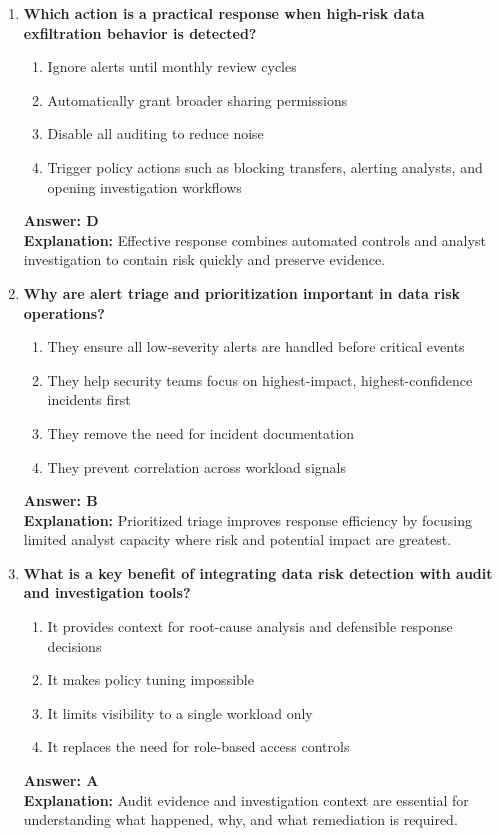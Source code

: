 \documentclass[10pt]{article}
\begin{document}
\begin{enumerate}[leftmargin=*]
\item \textbf{Which action is a practical response when high-risk data exfiltration behavior is detected?}
\begin{enumerate}[label=\Alph*.]
  \item Ignore alerts until monthly review cycles
  \item Automatically grant broader sharing permissions
  \item Disable all auditing to reduce noise
  \item Trigger policy actions such as blocking transfers, alerting analysts, and opening investigation workflows
\end{enumerate}
\textbf{Answer: D}\\
\textbf{Explanation:} Effective response combines automated controls and analyst investigation to contain risk quickly and preserve evidence.

\item \textbf{Why are alert triage and prioritization important in data risk operations?}
\begin{enumerate}[label=\Alph*.]
  \item They ensure all low-severity alerts are handled before critical events
  \item They help security teams focus on highest-impact, highest-confidence incidents first
  \item They remove the need for incident documentation
  \item They prevent correlation across workload signals
\end{enumerate}
\textbf{Answer: B}\\
\textbf{Explanation:} Prioritized triage improves response efficiency by focusing limited analyst capacity where risk and potential impact are greatest.

\item \textbf{What is a key benefit of integrating data risk detection with audit and investigation tools?}
\begin{enumerate}[label=\Alph*.]
  \item It provides context for root-cause analysis and defensible response decisions
  \item It makes policy tuning impossible
  \item It limits visibility to a single workload only
  \item It replaces the need for role-based access controls
\end{enumerate}
\textbf{Answer: A}\\
\textbf{Explanation:} Audit evidence and investigation context are essential for understanding what happened, why, and what remediation is required.


\end{enumerate}
\end{document}

